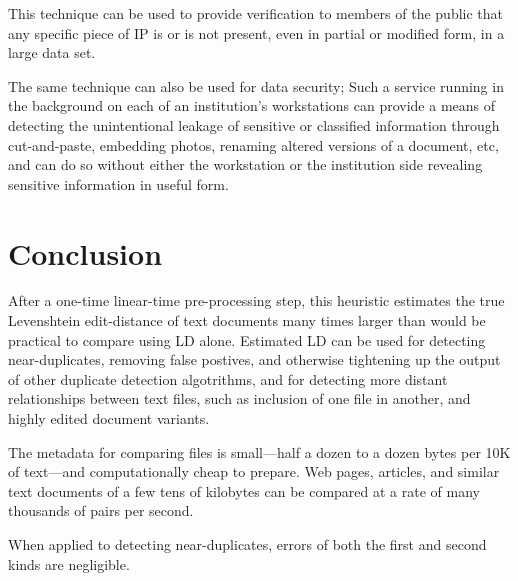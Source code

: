 \documentclass[html]{article}    %
\begin{document}
\begin{itemize}
{  		This technique can be used to provide verification to members of the public that 
  		any specific piece of IP is or is not present, even in partial or modified
  		form, in a large data set.
  		
  		The same technique can also be used for data security;
  		Such a service running in the background on each of an institution's workstations can provide a
  		means of detecting the unintentional leakage of sensitive or classified
  		information through cut-and-paste, embedding photos, renaming altered
  		versions of a document, etc, and can do so without either the workstation or the institution 
  		side revealing sensitive information in useful form. 
  	}
\end{itemize}

\section{Conclusion}
After a one-time linear-time pre-processing step, this heuristic estimates the
true Levenshtein edit-distance of text documents many times larger than would be
practical to compare using LD alone.
Estimated LD can be used for detecting near-duplicates, removing false postives,
and otherwise tightening up the output of other duplicate detection algotrithms,
and for detecting more distant relationships between text files, such as
inclusion of one file in another, and highly edited document variants.

The metadata for comparing files is small---half a dozen to a dozen bytes per
10K of text---and computationally cheap to prepare. 
Web pages, articles, and similar text documents of a few tens of kilobytes can
be compared at a rate of many thousands of pairs per second. 

When applied to detecting near-duplicates, errors of both the first and second
kinds are negligible.

% 
%
% 
\end{document}
